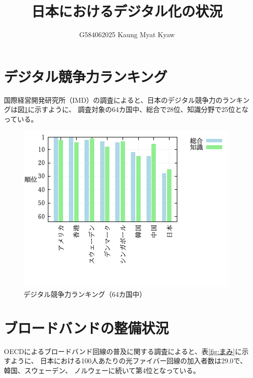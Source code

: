 \documentclass[a4paper,11pt,dvipdfmx]{ujarticle}
\title{日本におけるデジタル化の状況}
\author{G584062025 Kaung Myat Kyaw}
\begin{document}
\maketitle
\section{デジタル競争力ランキング}

国際経営開発研究所（IMD）の調査\cite{imd}によると、日本のデジタル競争力のランキングは図\ref{fig:かき}に示すように、
調査対象の64カ国中、総合で28位、知識分野で25位となっている。

\begin{figure}[htbp]
    \centering
    \includegraphics{fig31.png}
    \caption{デジタル競争力ランキング（64カ国中）}\label{fig:かき}
\end{figure}

\section{ブロードバンドの整備状況}
OECDによるブロードバンド回線の普及に関する調査\cite{oecd}によると、表\ref{fig:まみ}に示すように、
日本における100人あたりの光ファイバー回線の加入者数は29.0で、韓国、スウェーデン、
ノルウェーに続いて第4位となっている。
\end{document}
